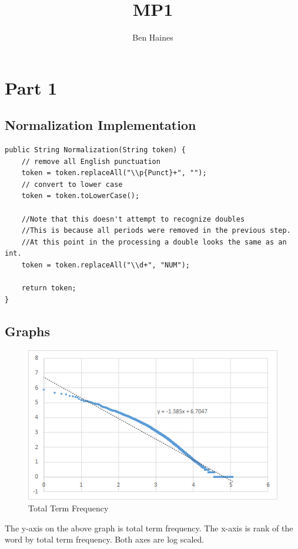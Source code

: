 \documentclass[paper=a4, fontsize=11pt]{jhwhw} %
\begin{document}
\title{MP1}
\author{Ben Haines}

\section{Part 1}
\subsection{Normalization Implementation}
\begin{lstlisting}
public String Normalization(String token) {
    // remove all English punctuation
    token = token.replaceAll("\\p{Punct}+", "");
    // convert to lower case
    token = token.toLowerCase();

    //Note that this doesn't attempt to recognize doubles
    //This is because all periods were removed in the previous step.
    //At this point in the processing a double looks the same as an int.
    token = token.replaceAll("\\d+", "NUM");

    return token;
}
\end{lstlisting}

\subsection{Graphs}
\begin{figure}[h!]
    \caption{Total Term Frequency}
    \includegraphics{ttfoutgraph}
\end{figure}
The y-axis on the above graph is total term frequency. The x-axis is rank of the word by total term frequency. Both axes are log scaled.
\end{document}
